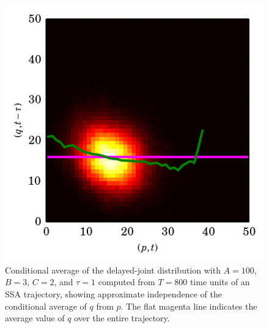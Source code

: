 \documentclass[english,letterpaper,12pt]{report}
\begin{document}
\begin{doublespacing}
\begin{figure}
    \begin{center}
        \includegraphics{../results/thesis/ddjd-ca-a100-c2-t1.png}
    \end{center}
    \caption{Conditional average of the delayed-joint distribution with $A=100$, $B=3$, $C=2$, and $\tau=1$ computed from $T=800$ time units of an SSA trajectory, showing approximate independence of the conditional average of $q$ from $p$. The flat magenta line indicates the average value of $q$ over the entire trajectory.}
\end{figure}


\end{doublespacing}
\end{document}
